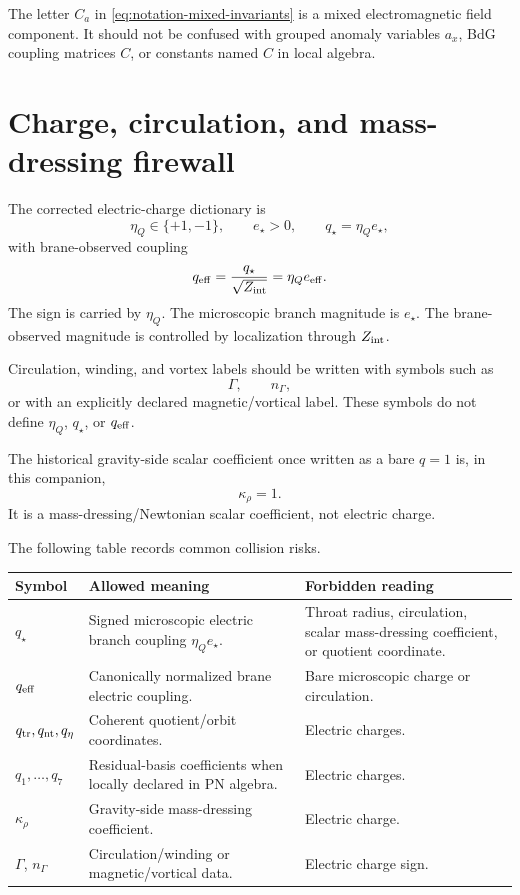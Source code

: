 The letter \(C_a\) in \eqref{eq:notation-mixed-invariants} is a mixed electromagnetic field component.  It should not be confused with grouped anomaly variables \(a_x\), BdG coupling matrices \(C\), or constants named \(C\) in local algebra.

\section{Charge, circulation, and mass-dressing firewall}
\label{sec:charge-circulation-firewall}

The corrected electric-charge dictionary is
\begin{equation}
  \eta_Q\in\{+1,-1\},
  \qquad
  e_\star>0,
  \qquad
  q_\star=\eta_Qe_\star,
\end{equation}
with brane-observed coupling
\begin{equation}
  q_{\rm eff}=\frac{q_\star}{\sqrt{Z_{\rm int}}}
  =\eta_Qe_{\rm eff}.
\end{equation}
The sign is carried by \(\eta_Q\).  The microscopic branch magnitude is \(e_\star\).  The brane-observed magnitude is controlled by localization through \(Z_{\rm int}\).

Circulation, winding, and vortex labels should be written with symbols such as
\begin{equation}
  \Gamma,
  \qquad
  n_\Gamma,
\end{equation}
or with an explicitly declared magnetic/vortical label.  These symbols do not define \(\eta_Q\), \(q_\star\), or \(q_{\rm eff}\).

The historical gravity-side scalar coefficient once written as a bare \(q=1\) is, in this companion,
\begin{equation}
  \kappa_\rho=1.
\end{equation}
It is a mass-dressing/Newtonian scalar coefficient, not electric charge.

The following table records common collision risks.

\begin{longtable}{L{0.18\textwidth}L{0.34\textwidth}L{0.38\textwidth}}
\toprule
Symbol & Allowed meaning & Forbidden reading \\
\midrule
\endhead
\(q_\star\) & Signed microscopic electric branch coupling \(\eta_Qe_\star\). & Throat radius, circulation, scalar mass-dressing coefficient, or quotient coordinate. \\
\addlinespace
\(q_{\rm eff}\) & Canonically normalized brane electric coupling. & Bare microscopic charge or circulation. \\
\addlinespace
\(q_{\rm tr},q_{\rm nt},q_\eta\) & Coherent quotient/orbit coordinates. & Electric charges. \\
\addlinespace
\(q_1,\ldots,q_7\) & Residual-basis coefficients when locally declared in PN algebra. & Electric charges. \\
\addlinespace
\(\kappa_\rho\) & Gravity-side mass-dressing coefficient. & Electric charge. \\
\addlinespace
\(\Gamma\), \(n_\Gamma\) & Circulation/winding or magnetic/vortical data. & Electric charge sign. \\
\bottomrule
\end{longtable}

